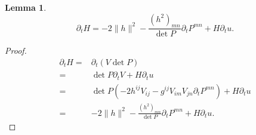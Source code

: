 \documentclass{amsart}
\newtheorem{lemma}[theorem]{Lemma}
\theoremstyle{definition}
\theoremstyle{remark}
\numberwithin{equation}{section}
\begin{document}
\begin{lemma}
\begin{equation}
\partial_tH=-2\|h\|^2-\frac{(h^2)_{mn}}{\det P}\partial_tP^{mn}+H\partial_tu.
\end{equation}
\end{lemma}
\begin{proof}
\begin{align*}
\partial_tH=&\partial_t(V\det P)\\
=&\det P\partial_t V+H\partial_tu\\
=&\det P(-2h^{ij}V_{ij}-g^{ij}V_{im}V_{jn}\partial_tP^{mn})+H\partial_tu\\
=&-2\|h\|^2-\frac{(h^2)_{mn}}{\det P}\partial_tP^{mn}+H\partial_tu.
\end{align*}
\end{proof}
\end{document}
